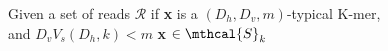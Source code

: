 \documentclass[preview]{standalone}
\begin{document}
\begin{center}
Given a set of reads $\mathcal{R}$ if \textbf{x} is a $(D_h,D_v,m)$-typical K-mer, \\
            and $D_v V_s(D_h,k) < m$  \textbf{x} $\in \mthcal{S}_k $
\end{center}
\end{document}
